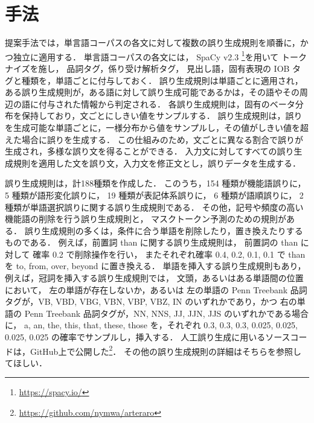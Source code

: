 \documentclass[
  platex, dvipdfmx %
]{nlp2021}
\begin{document}
\section{手法}
提案手法では，単言語コーパスの各文に対して複数の誤り生成規則を順番に，かつ独立に適用する．
単言語コーパスの各文には，
SpaCy v2.3 \footnote{\url{https://spacy.io/}}を用いて
トークナイズを施し，
品詞タグ，係り受け解析タグ，
見出し語，固有表現の IOB タグと種類を，単語ごとに付与しておく．
誤り生成規則は単語ごとに適用され，
ある誤り生成規則が，ある語に対して誤り生成可能であるかは，その語やその周辺の語に付与された情報から判定される．
各誤り生成規則は，固有のベータ分布を保持しており，文ごとにしきい値をサンプルする．
誤り生成規則は，誤りを生成可能な単語ごとに，一様分布から値をサンプルし，その値がしきい値を超えた場合に誤りを生成する．
この仕組みのため，文ごとに異なる割合で誤りが生成され，多様な誤り文を得ることができる．
入力文に対してすべての誤り生成規則を適用した文を誤り文，入力文を修正文とし，誤りデータを生成する．

誤り生成規則は，計188種類を作成した．
このうち，154 種類が機能語誤りに，
5 種類が語形変化誤りに，
19 種類が表記体系誤りに，
6 種類が語順誤りに，
2 種類が単語選択誤りに関する誤り生成規則である．
その他，記号や頻度の高い機能語の削除を行う誤り生成規則と，
マスクトークン予測のための規則がある．
誤り生成規則の多くは，条件に合う単語を削除したり，置き換えたりするものである．
例えば，前置詞 than に関する誤り生成規則は，
前置詞の than に対して
確率 0.2 で削除操作を行い，
またそれぞれ確率 0.4, 0.2, 0.1, 0.1 で than を to, from, over, beyond に置き換える．
単語を挿入する誤り生成規則もあり，
例えば，冠詞を挿入する誤り生成規則では，
文頭，あるいはある単語間の位置において，
左の単語が存在しないか，あるいは
左の単語の Penn Treebank 品詞タグが，VB, VBD, VBG, VBN, VBP, VBZ, IN のいずれかであり，かつ
右の単語の Penn Treebank 品詞タグが，NN, NNS, JJ, JJN, JJS のいずれかである場合に，
a, an, the, this, that, these, those を，それぞれ 0.3, 0.3, 0.3, 0.025, 0.025, 0.025, 0.025 の確率でサンプルし，挿入する．
人工誤り生成に用いるソースコードは，GitHub上で公開した\footnote{\url{https://github.com/nymwa/arteraro}}．
その他の誤り生成規則の詳細はそちらを参照してほしい．
\end{document}
